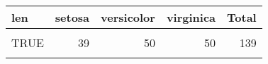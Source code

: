\documentclass[10pt]{article}
\begin{document}
	\thispagestyle{empty}
\begin{table}[H]
\centering\begingroup\fontsize{10}{12}\selectfont

\begin{tabular}{>{\raggedright\arraybackslash}p{1in}rrrr}
\toprule
len & setosa & versicolor & virginica & Total\\
\midrule
\cellcolor{gray!6}{FALSE} & \cellcolor{gray!6}{11} & \cellcolor{gray!6}{0} & \cellcolor{gray!6}{0} & \cellcolor{gray!6}{11}\\
TRUE & 39 & 50 & 50 & 139\\
\cellcolor{gray!6}{Total} & \cellcolor{gray!6}{50} & \cellcolor{gray!6}{50} & \cellcolor{gray!6}{50} & \cellcolor{gray!6}{150}\\
\bottomrule
\end{tabular}
\endgroup{}
\end{table}
\end{document}

